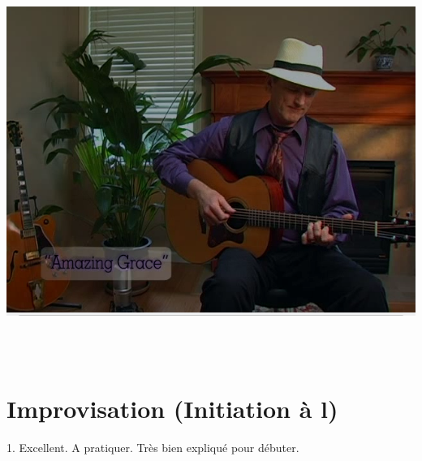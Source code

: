 \documentclass[a4paper]{book}
\begin{document}
\begin{center}
\includegraphics[width=16.903cm,height=12.778cm]{lebluessupportsmethodes-img102.png}
\end{center}
\clearpage


\section[Improvisation (Initiation \`a
l{\textquotesingle})]{Improvisation (Initiation \`a
l{\textquotesingle})}
\hypertarget{RefHeadingToc160973218262}{}1. Excellent. A pratiquer.
Tr\`es bien expliqu\'e pour d\'ebuter.
\end{document}
